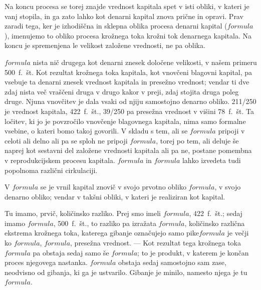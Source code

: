 \documentclass[a5paper]{scrbook}
\begin{document}
Na koncu procesa se torej znajde vrednost kapitala spet v isti obliki, v kateri je vanj stopila, in ga zato lahko kot denarni kapital znova prične in opravi. Prav zaradi tega, ker je izhodiščna in sklepna oblika procesa denarni kapital (\( formula \)), imenujemo to obliko procesa krožnega toka krožni tok denarnega kapitala. Na koncu je spremenjena le velikost založene vrednosti, ne pa oblika.

\( formula \) nista nič drugega kot denarni znesek določene velikosti, v našem primeru 500~f.~št. Kot rezultat krožnega toka kapitala, kot vnovčeni blagovni kapital, pa vsebuje ta denarni znesek vrednost kapitala in presežno vrednost; vendar ti dve zdaj nista več vraščeni druga v drugo kakor v preji, zdaj stojita druga poleg druge. Njuna vnovčitev je dala vsaki od njiju samostojno denarno obliko. 211/250 je vrednost kapitala, 422~f.~št., 39/250 pa presežna vrednost v višini 78~f.~št. Ta ločitev, ki jo je povzročilo vnovčenje blagovnega kapitala, nima samo formalne vsebine, o kateri bomo takoj govorili. V skladu s tem, ali se \( formula \) pripoji v celoti ali delno ali pa se sploh ne pripoji \( formula \), torej po tem, ali deluje še naprej kot sestavni del založene vrednosti kapitala ali pa ne, postane pomembna v reprodukcijskem procesu kapitala. \( formula \) in \( formula \) lahko izvedeta tudi popolnoma različni cirkulaciji.

V \( formula \) se je vrnil kapital znovič v svojo prvotno obliko \( formula \), v svojo denarno obliko; vendar v takšni obliki, v kateri je realiziran kot kapital.

Tu imamo, prvič, količinsko razliko. Prej smo imeli \( formula \), 422~f.~št.; sedaj imamo \( formula \), 500~f.~št., to razliko pa izražata \( formula \), količinsko različna ekstrema krožnega toka, katerega gibanje označujejo samo pike\( formula \) je večji ko \( formula \), \( formula \), presežna vrednost. --- Kot rezultat tega krožnega toka \( formula \) pa obstaja sedaj samo še \( formula \); to je produkt, v katerem je končan proces njegovega nastanka. \( formula \) obstaja sedaj samostojno sam zase, neodvisno od gibanja, ki ga je ustvarilo. Gibanje je minilo, namesto njega je tu \( formula \).
\end{document}
